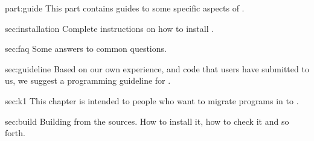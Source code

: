 
\begin{partDescription}{part:guide}
  {
    This part contains guides to some specific aspects of \usdk.
  }
\item[sec:installation]
  Complete instructions on how to install \usdk.
\item[sec:faq]
  Some answers to common questions.
\item[sec:guideline]
  Based on our own experience, and code that users have submitted to us, we
  suggest a programming guideline for \usdk.
\item[sec:k1] This chapter is intended to people who want to migrate
  programs in  to .
\item[sec:build] Building \usdk from the sources.  How to install it,
  how to check it and so forth.
\end{partDescription}

